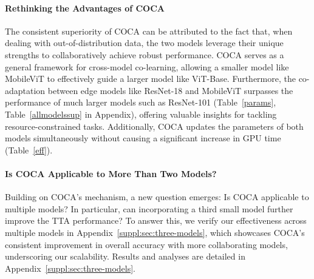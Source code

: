 \paragraph{Rethinking the Advantages of COCA} The consistent superiority of COCA can be attributed to the fact that, when dealing with out-of-distribution data, the two models leverage their unique strengths to collaboratively achieve robust performance. COCA serves as a general framework for cross-model co-learning, allowing a smaller model like MobileViT to effectively guide a larger model like ViT-Base. Furthermore, the co-adaptation between edge models like ResNet-18 and MobileViT surpasses the performance of much larger models such as ResNet-101 (Table~\ref{params}, Table~\ref{allmodelssup} in Appendix), offering valuable insights for tackling resource-constrained tasks. Additionally, COCA updates the parameters of both models simultaneously without causing a significant increase in GPU time (Table~\ref{eff}). 
\vspace{-7pt}
\paragraph{Is COCA Applicable to More Than Two Models?}
Building on COCA’s mechanism, a new question emerges: Is COCA applicable to multiple models? In particular, can incorporating a third small model further improve the TTA performance? To answer this, we verify our effectiveness across multiple models in Appendix~\ref{suppl:sec:three-models}, which showcases COCA's consistent improvement in overall accuracy with more collaborating models, underscoring our scalability. Results and analyses are detailed in Appendix~\ref{suppl:sec:three-models}.




